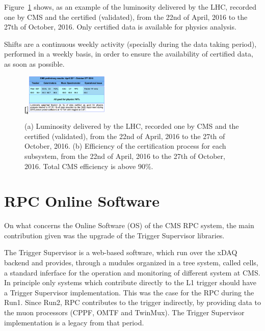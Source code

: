 Figure~\ref{lumi} shows, as an example of the luminosity delivered by the LHC, recorded one by CMS and the certified (validated), from the 22nd of April, 2016 to the 27th of October, 2016. Only certified data is available for physics analysis.

Shifts are a continuous weekly activity (specially during the data taking period), performed in a weekly basis, in order to ensure the availability of certified data, as soon as possible.
 
\begin{figure}%
    \centering
    \qquad
    \c[]{{\includegraphics[width=0.35\textwidth,keepaspectratio]{figures/rpc/lumi_table.png} }}%
    \caption{(a) Luminosity delivered by the LHC, recorded one by CMS and the certified (validated), from the 22nd of April, 2016 to the 27th of October, 2016. (b) Efficiency of the certification process for each subsystem, from the 22nd of April, 2016 to the 27th of October, 2016. Total CMS efficiency is above 90\%. \cite{certification}}%
    \label{lumi}%
\end{figure}



\section{RPC Online Software}

On what concerns the Online Software (OS) of the CMS RPC system, the main contribution given was the upgrade of the Trigger Supervisor libraries.

The Trigger Supervisor is a web-based software, which run over the xDAQ backend and provides, through a mudules organized in a tree system, called cells, a standard inferface for the operation and monitoring of different system at CMS. In principle only systems which contribute directly to the L1 trigger should have a Trigger Supervisor implementation. This was the case for the  RPC during the Run1. Since Run2, RPC contributes to the trigger indirectly, by providing data to the muon processors (CPPF, OMTF and TwinMux). The Trigger Supervisor implementation is a legacy from that period.

